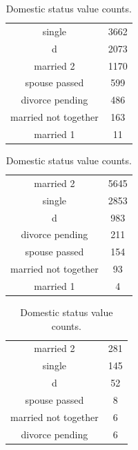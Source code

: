 \begin{table}[!h]
    \caption{Domestic status value counts.}
    \label{tab:domestic-status}

    \begin{subtable}[ht]{.5\textwidth}
        \centering
        \begin{tabular}{cc}
            single & 3662 \\
            d & 2073 \\
            married 2 & 1170 \\
            spouse passed & 599 \\
            divorce pending & 486 \\
            married not together & 163 \\
            married 1 & 11 \\
        \end{tabular}
    \end{subtable}
    \begin{subtable}[ht]{.5\textwidth}
        \centering
        \begin{tabular}{cc}
            married 2 & 5645 \\
            single & 2853 \\
            d & 983 \\
            divorce pending & 211 \\
            spouse passed & 154 \\
            married not together & 93 \\
            married 1 & 4 \\
        \end{tabular}
    \end{subtable}

    \vspace{5mm}

    \begin{subtable}[ht]{.5\textwidth}
        \centering
        \begin{tabular}{cc}
            married 2 & 281 \\
            single & 145 \\
            d & 52 \\
            spouse passed & 8 \\
            married not together & 6 \\
            divorce pending & 6 \\
        \end{tabular}
    \end{subtable}
\end{table}


